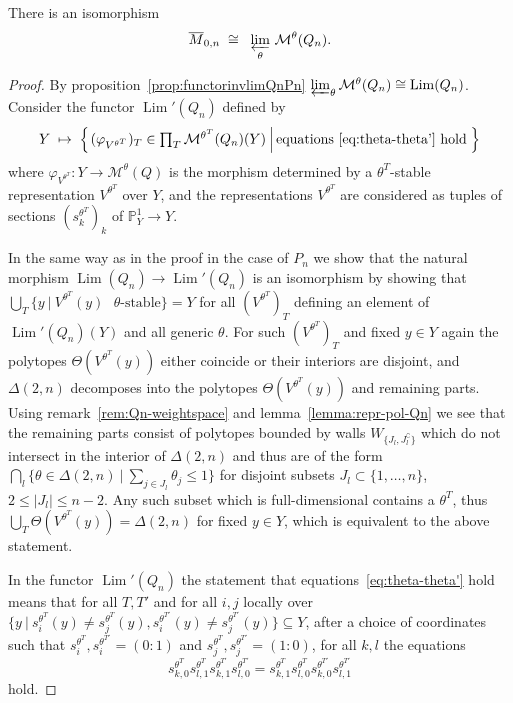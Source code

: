 \documentclass[ALCO,ThmDefs,Unicode,epreuves]{cedram}
\def\phi{\varphi}
\def\P{\mathds P}
\DeclareMathOperator{\Lim}{Lim}
\begin{document}
\begin{theo}\label{thm:M0n-limQn}
There is an isomorphism
\[\overline{M}_{0,n}\;\cong\;\;\varprojlim_\theta\,\mathcal M^\theta(Q_n).\]
\end{theo}
\begin{proof}
By proposition~\ref{prop:functorinvlimQnPn} 
$\varprojlim_\theta\mathcal M^\theta(Q_n)\cong\Lim(Q_n)$.
Consider the functor $\Lim'(Q_n)$ defined by
\[\textstyle
Y\;\mapsto\;
\left\{\left.
(\phi_{V^{\theta^T}})_T\in\prod_T\mathcal M^{\theta^T}(Q_n)(Y)
\:\right|
\text{equations~\eqref{eq:theta-theta'} hold}\;
\right\}
\]
where $\phi_{V^{\theta^T}}\colon Y\to\mathcal M^\theta(Q)$ is the morphism determined by a
$\theta^T$-stable representation $V^{\theta^T}$ over $Y$, and the representations
$V^{\theta^T}$ are considered as tuples of sections $(s^{\theta^T}_k)_k$ of $\P^1_Y\to Y$.

In the same way as in the proof in the case of $P_n$ we show that the 
natural morphism $\Lim(Q_n)\to\Lim'(Q_n)$ is an isomorphism by showing that 
$\bigcup_T\{y\:|\:\text{$V^{\theta^T}\!(y)$ $\theta$-stable}\}=Y$ for all
$(V^{\theta^T})_T$ defining an element of $\Lim'(Q_n)(Y)$ and all generic $\theta$.
For such $(V^{\theta^T})_T$ and fixed $y\in Y$ again the polytopes 
$\Theta(V^{\theta^T}\!(y))$ either coincide or their interiors are disjoint, 
and $\Delta(2,n)$ decomposes into the polytopes $\Theta(V^{\theta^T}\!(y))$ 
and remaining parts.
Using remark~\ref{rem:Qn-weightspace} and lemma~\ref{lemma:repr-pol-Qn} we see that
the remaining parts consist of polytopes bounded by walls $W_{\{J_l,J_l^\complement\}}$
which do not intersect in the interior of $\Delta(2,n)$ and thus are of the form
$\bigcap_l\{\theta\in\Delta(2,n)\:|\:\sum_{j\in J_l}\theta_j\leq 1\}$ for 
disjoint subsets $J_l\subset\{1,\ldots,n\}$, $2\leq|J_l|\leq n-2$. 
Any such subset which is full-dimensional contains a $\theta^T$, 
thus $\bigcup_T\Theta(V^{\theta^T}\!(y))=\Delta(2,n)$ for fixed $y\in Y$, 
which is equivalent to the above statement.

In the functor $\Lim'(Q_n)$ the statement that equations~\ref{eq:theta-theta'} 
hold means that for all $T,T'$ and for all $i,j$ locally over 
$\big\{y\:|\:s^{\theta^T}_i\!(y)\neq s^{\theta^T}_j\!(y),
s^{\theta^{T'}}_i\!\!(y)\neq s^{\theta^{T'}}_j\!\!(y)\big\}\subseteq Y$, 
after a choice of coordinates such that $s^{\theta^T}_i\!\!,s^{\theta^{T'}}_i\!\!=(0:1)$
and $s^{\theta^T}_j\!\!,s^{\theta^{T'}}_j\!\!=(1:0)$, for all $k,l$ the equations
\begin{equation}\label{eq:thetaT-thetaT'}
s^{\theta^T}_{k,0}s^{\theta^T}_{l,1}s^{\theta^{T'}}_{k,1}s^{\theta^{T'}}_{l,0}
=s^{\theta^T}_{k,1}s^{\theta^T}_{l,0}s^{\theta^{T'}}_{k,0}s^{\theta^{T'}}_{l,1}
\end{equation}
hold. 


\end{proof}
\end{document}
